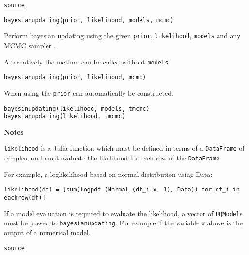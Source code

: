 \begin{adjustwidth}{2em}{0pt}
\href{https://github.com/friesischscott/UncertaintyQuantification.jl/blob/f5ee6cce729f0d6a57979257379c942cdf42f86f/src/modelupdating/bayesianMAP.jl#L112-L136}{\texttt{source}}



\begin{verbatim}
bayesianupdating(prior, likelihood, models, mcmc)
\end{verbatim}

Perform bayesian updating using the given \texttt{prior}, \texttt{likelihood}, \texttt{models}  and any MCMC sampler .

Alternatively the method can be called without \texttt{models}.


\begin{verbatim}
bayesianupdating(prior, likelihood, mcmc)
\end{verbatim}

When using  the \texttt{prior} can automatically be constructed.


\begin{verbatim}
bayesinupdating(likelihood, models, tmcmc)
bayesianupdating(likelihood, tmcmc)
\end{verbatim}

\textbf{Notes}

\texttt{likelihood} is a Julia function which must be defined in terms of a \texttt{DataFrame} of samples, and must evaluate the likelihood for each row of the \texttt{DataFrame}

For example, a loglikelihood based on normal distribution using {\textquotesingle}Data{\textquotesingle}:


\begin{verbatim}
likelihood(df) = [sum(logpdf.(Normal.(df_i.x, 1), Data)) for df_i in eachrow(df)]
\end{verbatim}

If a model evaluation is required to evaluate the likelihood, a vector of \texttt{UQModel}s must be passed to \texttt{bayesianupdating}. For example if the variable \texttt{x} above is the output of a numerical model.



\href{https://github.com/friesischscott/UncertaintyQuantification.jl/blob/f5ee6cce729f0d6a57979257379c942cdf42f86f/src/modelupdating/bayesianupdating.jl#L34-L61}{\texttt{source}}


\end{adjustwidth}

